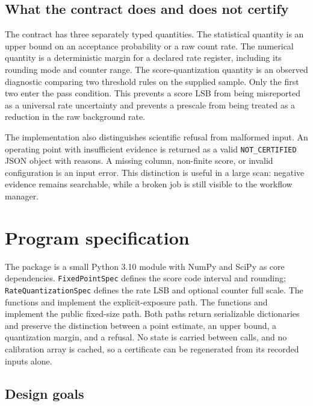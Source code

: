 \documentclass[preprint,12pt]{elsarticle}
\begin{document}
\subsection{What the contract does and does not certify}

The contract has three separately typed quantities.  The statistical quantity is
an upper bound on an acceptance probability or a raw count rate.  The numerical
quantity is a deterministic margin for a declared rate register, including its
rounding mode and counter range.  The score-quantization quantity is an observed
diagnostic comparing two threshold rules on the supplied sample.  Only the first
two enter the pass condition.  This prevents a score LSB from being misreported
as a universal rate uncertainty and prevents a prescale from being treated as a
reduction in the raw background rate.

The implementation also distinguishes scientific refusal from malformed input.
An operating point with insufficient evidence is returned as a valid
\verb|NOT_CERTIFIED| JSON object with reasons.  A missing column, non-finite
score, or invalid configuration is an input error.  This distinction is useful
in a large scan: negative evidence remains searchable, while a broken job is
still visible to the workflow manager.

\section{Program specification}
\label{sec:implementation}

The package is a small Python 3.10 module with NumPy and SciPy as core
dependencies.  \texttt{FixedPointSpec} defines the score code interval and
rounding; \texttt{RateQuantizationSpec} defines the rate LSB and optional
counter full scale.  The functions  and
 implement the explicit-exposure path.  The functions
 and  implement the
public fixed-size path.  Both paths return serializable dictionaries and
preserve the distinction between a point estimate, an upper bound, a
quantization margin, and a refusal.  No state is carried between calls, and no
calibration array is cached, so a certificate can be regenerated from its
recorded inputs alone.

\subsection{Design goals}
\end{document}
